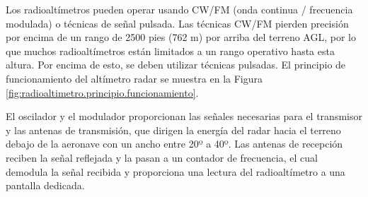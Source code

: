Los radioalt\'imetros pueden operar usando CW/FM (onda continua / frecuencia modulada) o técnicas de señal pulsada. Las técnicas CW/FM pierden precisión por encima de un rango de 2500 pies (762 m) por arriba del terreno \ac{AGL}, por lo que muchos radioaltímetros están limitados a un rango operativo hasta esta altura. Por encima de esto, se deben utilizar técnicas pulsadas. El principio de funcionamiento del altímetro radar se muestra en la Figura \ref{fig:radioaltimetro.principio.funcionamiento}. 

El oscilador y el modulador proporcionan las señales necesarias para el transmisor y las antenas de transmisión, que dirigen la energía del radar hacia el terreno debajo de la aeronave con un ancho entre 20º a 40º. 
Las antenas de recepci\'on reciben la se\~nal reflejada y la pasan a un contador de frecuencia, el cual demodula la señal recibida y proporciona una lectura del radioalt\'imetro a una pantalla dedicada.


\begin{figure}[!htb]
  \centering
  \hspace{0.05\textwidth}
    
\end{figure}


